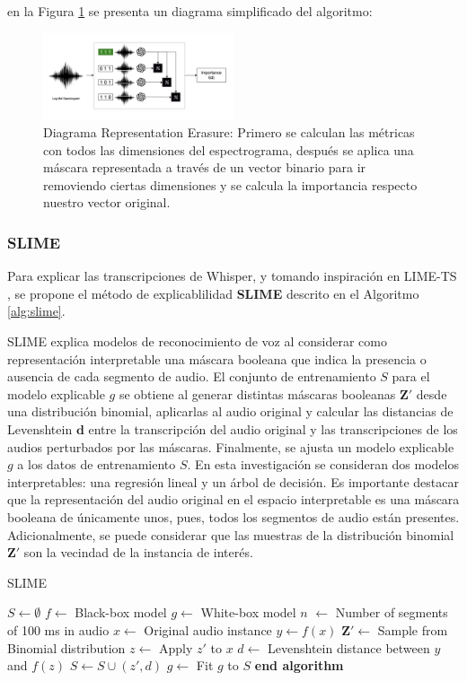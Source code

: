 \documentclass[conference]{IEEEtran}
\begin{document}
en la Figura \ref{fig:re-diagram} se presenta un diagrama simplificado del algoritmo:

\begin{figure}[ht]
\centerline{\includegraphics[width=0.5\textwidth]{images/RE-Diagram.png}}
\caption{Diagrama Representation Erasure: Primero se calculan las métricas con todos las dimensiones del espectrograma, después se aplica una máscara representada a través de un vector binario para ir removiendo ciertas dimensiones y se calcula la importancia respecto nuestro vector original.}
\label{fig:re-diagram}
\end{figure}

\subsubsection{SLIME}

Para explicar las transcripciones de Whisper, y tomando inspiración en LIME-TS \cite{wu2023trust}, se propone el método de explicablilidad \textbf{SLIME} descrito en el Algoritmo \ref{alg:slime}.

SLIME explica modelos de reconocimiento de voz al considerar como representación interpretable una máscara booleana que indica la presencia o ausencia de cada segmento de audio. El conjunto de entrenamiento $S$ para el modelo explicable $g$ se obtiene al generar distintas máscaras booleanas $\bm{Z'}$ desde una distribución binomial, aplicarlas al audio original y calcular las distancias de Levenshtein $\bm{d}$ entre la transcripción del audio original y las transcripciones de los audios perturbados por las máscaras. Finalmente, se ajusta un modelo explicable $g$ a los datos de entrenamiento $S$. En esta investigación se consideran dos modelos interpretables: una regresión lineal y un árbol de decisión. Es importante destacar que la representación del audio original en el espacio interpretable es una máscara booleana de únicamente unos, pues, todos los segmentos de audio están presentes. Adicionalmente, se puede considerar que las muestras de la distribución binomial $\bm{Z}'$ son la vecindad de la instancia de interés.

\begin{algorithm}[H]
\caption{SLIME}
\begin{algorithmic}[1]
\State $S \gets \emptyset$
\State $f \gets$ Black-box model
\State $g \gets $ White-box model
\State $n$ $\gets$ Number of segments of 100 ms in audio
\State $x \gets$ Original audio instance
\State $y \gets f(x)$
\State $\bm{Z}' \gets$ Sample from Binomial distribution
    \State $z \gets$ Apply $z'$ to $x$
    \State $d \gets$  Levenshtein distance between $y$ and $f(z)$
    \State $S \gets S \cup (z', d)$
\EndFor
\State $g \gets$ Fit $g$ to $S$
\State \textbf{end algorithm}
\end{algorithmic}
\label{alg:slime}
\end{algorithm}
\end{document}
